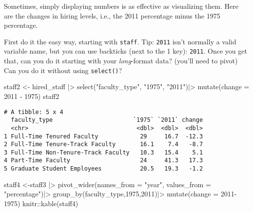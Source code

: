 \documentclass[
]{article}
\newenvironment{Shaded}{\begin{snugshade}}{\end{snugshade}}
\newcommand{\AttributeTok}[1]{\textcolor[rgb]{0.77,0.63,0.00}{#1}}
\newcommand{\FunctionTok}[1]{\textcolor[rgb]{0.00,0.00,0.00}{#1}}
\newcommand{\NormalTok}[1]{#1}
\newcommand{\OtherTok}[1]{\textcolor[rgb]{0.56,0.35,0.01}{#1}}
\newcommand{\SpecialCharTok}[1]{\textcolor[rgb]{0.00,0.00,0.00}{#1}}
\newcommand{\StringTok}[1]{\textcolor[rgb]{0.31,0.60,0.02}{#1}}
\begin{document}
Sometimes, simply displaying numbers is as effective as visualizing
them. Here are the changes in hiring levels, i.e., the 2011 percentage
minus the 1975 percentage.

First do it the easy way, starting with \texttt{staff}. Tip:
\texttt{2011} isn't normally a valid variable name, but you can use
backticks (next to the 1 key):
\texttt{\textasciigrave{}2011\textasciigrave{}}. Once you get that, can
you do it starting with your \emph{long}-format data? (you'll need to
pivot) Can you do it without using \texttt{select()}?

\begin{Shaded}
\begin{Highlighting}[]
\NormalTok{staff2 }\OtherTok{\textless{}{-}}\NormalTok{ hired\_staff }\SpecialCharTok{|\textgreater{}}
  \FunctionTok{select}\NormalTok{(}\StringTok{"faculty\_type"}\NormalTok{, }\StringTok{"1975"}\NormalTok{, }\StringTok{"2011"}\NormalTok{)}\SpecialCharTok{|\textgreater{}}
  \FunctionTok{mutate}\NormalTok{(}\AttributeTok{change =} \StringTok{\textasciigrave{}}\AttributeTok{2011}\StringTok{\textasciigrave{}} \SpecialCharTok{{-}} \StringTok{\textasciigrave{}}\AttributeTok{1975}\StringTok{\textasciigrave{}}\NormalTok{)}
\NormalTok{staff2}
\end{Highlighting}
\end{Shaded}

\begin{verbatim}
# A tibble: 5 x 4
  faculty_type                       `1975` `2011` change
  <chr>                               <dbl>  <dbl>  <dbl>
1 Full-Time Tenured Faculty            29     16.7  -12.3
2 Full-Time Tenure-Track Faculty       16.1    7.4   -8.7
3 Full-Time Non-Tenure-Track Faculty   10.3   15.4    5.1
4 Part-Time Faculty                    24     41.3   17.3
5 Graduate Student Employees           20.5   19.3   -1.2
\end{verbatim}

\begin{Shaded}
\begin{Highlighting}[]
\NormalTok{staff4 }\OtherTok{\textless{}{-}}\NormalTok{staff3 }\SpecialCharTok{|\textgreater{}}
  \FunctionTok{pivot\_wider}\NormalTok{(}\AttributeTok{names\_from =} \StringTok{"year"}\NormalTok{, }\AttributeTok{values\_from =} \StringTok{"percentage"}\NormalTok{)}\SpecialCharTok{|\textgreater{}}
  \FunctionTok{group\_by}\NormalTok{(}\StringTok{\textasciigrave{}}\AttributeTok{faculty\_type}\StringTok{\textasciigrave{}}\NormalTok{,}\StringTok{\textasciigrave{}}\AttributeTok{1975}\StringTok{\textasciigrave{}}\NormalTok{,}\StringTok{\textasciigrave{}}\AttributeTok{2011}\StringTok{\textasciigrave{}}\NormalTok{)}\SpecialCharTok{|\textgreater{}}
  \FunctionTok{mutate}\NormalTok{(}\AttributeTok{change =} \StringTok{\textasciigrave{}}\AttributeTok{2011}\StringTok{\textasciigrave{}}\SpecialCharTok{{-}}\StringTok{\textasciigrave{}}\AttributeTok{1975}\StringTok{\textasciigrave{}}\NormalTok{)}
\NormalTok{knitr}\SpecialCharTok{::}\FunctionTok{kable}\NormalTok{(staff4)}
\end{Highlighting}
\end{Shaded}
\end{document}
